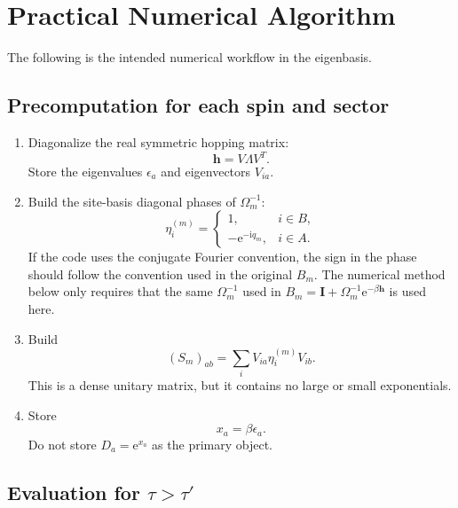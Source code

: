 \documentclass[11pt]{article}
\newcommand{\ii}{\mathrm{i}}
\newcommand{\e}{\mathrm{e}}
\newcommand{\1}{\mathbb{1}}
\newcommand{\bI}{\mathbf{I}}
\newcommand{\bh}{\mathbf{h}}
\begin{document}
\section{Practical Numerical Algorithm}

The following is the intended numerical workflow in the eigenbasis.

\subsection*{Precomputation for each spin and sector}

\begin{enumerate}[leftmargin=2em]
    \item Diagonalize the real symmetric hopping matrix:
    \[
        \bh=V\Lambda V^T.
    \]
    Store the eigenvalues \(\epsilon_a\) and eigenvectors \(V_{ia}\).

    \item Build the site-basis diagonal phases of \(\Omega_m^{-1}\):
    \[
        \eta_i^{(m)}
        =
        \begin{cases}
        1, & i\in B,\\
        -\e^{-\ii q_m}, & i\in A.
        \end{cases}
    \]
    If the code uses the conjugate Fourier convention, the sign in the
    phase should follow the convention used in the original \(B_m\).
    The numerical method below only requires that the same
    \(\Omega_m^{-1}\) used in \(B_m=\bI+\Omega_m^{-1}\e^{-\beta\bh}\)
    is used here.

    \item Build
    \[
        (S_m)_{ab}
        =
        \sum_i V_{ia}\eta_i^{(m)}V_{ib}.
    \]
    This is a dense unitary matrix, but it contains no large or small
    exponentials.

    \item Store
    \[
        x_a=\beta\epsilon_a.
    \]
    Do not store \(D_a=\e^{x_a}\) as the primary object.
\end{enumerate}

\subsection*{Evaluation for \(\tau>\tau'\)}
\end{document}
